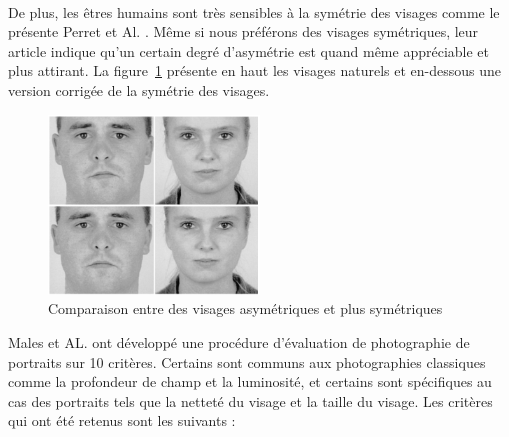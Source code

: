 \documentclass[11pt, french]{report-rd-info}
\begin{document}
\paragraph*{}
De plus, les êtres humains sont très sensibles à la symétrie des visages comme le présente Perret et Al. \cite{Perrett1999}. Même si nous préférons des visages symétriques, leur article indique qu'un certain degré d'asymétrie est quand même appréciable et plus attirant. La figure~\ref{fig:VisagesSymetriques} présente en haut les visages naturels et en-dessous une version corrigée de la symétrie des visages.
 
 \begin{figure}
	\centering
	\includegraphics[width=0.5\textwidth]{Images/ea_visages_symetriques}
	\caption{Comparaison entre des visages asymétriques et plus symétriques\cite{Perrett1999}}
	\label{fig:VisagesSymetriques}
\end{figure}

Males et AL. \cite{Males2013} ont développé une procédure d'évaluation de photographie de portraits sur 10 critères. Certains sont communs aux photographies classiques comme la profondeur de champ et la luminosité, et certains sont spécifiques au cas des portraits tels que la netteté du visage et la taille du visage. Les critères qui ont été retenus sont les suivants : 
\end{document}

